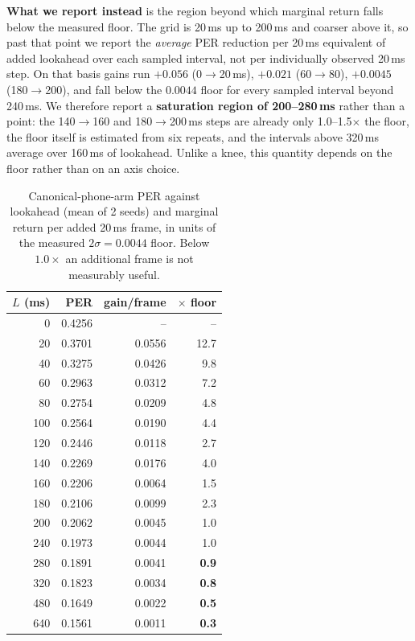 \documentclass{article}
\begin{document}
\textbf{What we report instead} is the region beyond which marginal return
falls below the measured floor. The grid is 20\,ms up to 200\,ms and coarser
above it, so past that point we report the \emph{average} PER reduction per
20\,ms equivalent of added lookahead over each sampled interval, not per
individually observed 20\,ms step. On that basis gains run $+0.056$
(0$\rightarrow$20\,ms), $+0.021$ (60$\rightarrow$80), $+0.0045$
(180$\rightarrow$200), and fall below the $0.0044$ floor for every sampled
interval beyond 240\,ms. We therefore report a \textbf{saturation region of
200--280\,ms} rather than a point: the 140$\rightarrow$160 and
180$\rightarrow$200\,ms steps are already only 1.0--1.5$\times$ the floor, the
floor itself is estimated from six repeats, and the intervals above 320\,ms
average over 160\,ms of lookahead. Unlike a knee, this quantity depends on the
floor rather than on an axis choice.

\begin{table}[t]
\centering\small
\caption{Canonical-phone-arm PER against lookahead (mean of 2 seeds) and marginal
return per added 20\,ms frame, in units of the measured $2\sigma{=}0.0044$
floor. Below $1.0\times$ an additional frame is not measurably useful.}
\label{tab:dense}
\begin{tabular}{rrrr}
\toprule
$L$ (ms) & PER & gain/frame & $\times$ floor \\
\midrule
0   & 0.4256 & --     & -- \\
20  & 0.3701 & 0.0556  & 12.7 \\
40  & 0.3275 & 0.0426  & 9.8 \\
60  & 0.2963 & 0.0312  & 7.2 \\
80  & 0.2754 & 0.0209  & 4.8 \\
100 & 0.2564 & 0.0190  & 4.4 \\
120 & 0.2446 & 0.0118  & 2.7 \\
140 & 0.2269 & 0.0176  & 4.0 \\
160 & 0.2206 & 0.0064  & 1.5 \\
180 & 0.2106 & 0.0099  & 2.3 \\
200 & 0.2062 & 0.0045  & 1.0 \\
240 & 0.1973 & 0.0044  & 1.0 \\
280 & 0.1891 & 0.0041  & \textbf{0.9} \\
320 & 0.1823 & 0.0034  & \textbf{0.8} \\
480 & 0.1649 & 0.0022  & \textbf{0.5} \\
640 & 0.1561 & 0.0011  & \textbf{0.3} \\
\bottomrule
\end{tabular}
\end{table}
\end{document}
